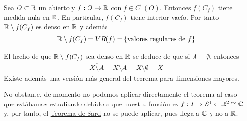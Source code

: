 \begin{teo}\label{teo:sard}
    Sea $O\subset \mathbb{R}$ un abierto y $f:O\to \mathbb{R}$ con $f\in C^1(O)$. Entonces $f(C_f)$ tiene medida nula en $\mathbb{R}$. En particular, $f(C_f)$ tiene interior vacío. Por tanto $\mathbb{R}\setminus f(C_f)$ es denso en $\mathbb{R}$ y además 
    \begin{gather*}
        \mathbb{R}\setminus f(C_f) = VR(f) = \{\text{valores regulares de $f$}\}
    \end{gather*}
\end{teo}

\begin{observacion}
    El hecho de que $\mathbb{R}\setminus f(C_f)$ sea denso en $\mathbb{R}$ se deduce de que si $\overset{\circ}{A}=\emptyset$, entonces 
    \begin{gather*}
        \overline{X\setminus A} = X\setminus A = X\setminus \emptyset = X
    \end{gather*}
    Existe además una versión más general del teorema para dimensiones mayores.
\end{observacion}

No obstante, de momento no podemos aplicar directamente el teorema al caso que estábamos estudiando debido a que nuestra función es $f:I \to S^1 \subset \mathbb{R}^2 \cong \mathbb{C}$ y, por tanto, el \hyperref[teo:sard]{Teorema de Sard} no se puede aplicar, pues llega a $\mathbb{C}$ y no a $\mathbb{R}$.\\

